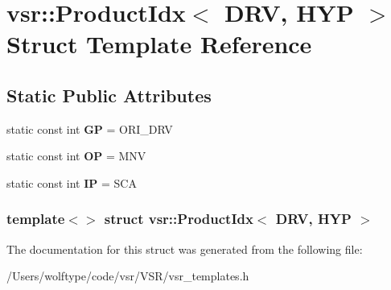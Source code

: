 \hypertarget{structvsr_1_1_product_idx_3_01_d_r_v_00_01_h_y_p_01_4}{\section{vsr\-:\-:Product\-Idx$<$ D\-R\-V, H\-Y\-P $>$ Struct Template Reference}
\label{structvsr_1_1_product_idx_3_01_d_r_v_00_01_h_y_p_01_4}
}
\subsection*{Static Public Attributes}
\begin{DoxyCompactItemize}
\item 
\hypertarget{structvsr_1_1_product_idx_3_01_d_r_v_00_01_h_y_p_01_4_a233726f20094809839500490e3f18b76}{static const int {\bfseries G\-P} = O\-R\-I\-\_\-\-D\-R\-V}\label{structvsr_1_1_product_idx_3_01_d_r_v_00_01_h_y_p_01_4_a233726f20094809839500490e3f18b76}

\item 
\hypertarget{structvsr_1_1_product_idx_3_01_d_r_v_00_01_h_y_p_01_4_a51993dbacb5b31d156bba56c8cbac2cd}{static const int {\bfseries O\-P} = M\-N\-V}\label{structvsr_1_1_product_idx_3_01_d_r_v_00_01_h_y_p_01_4_a51993dbacb5b31d156bba56c8cbac2cd}

\item 
\hypertarget{structvsr_1_1_product_idx_3_01_d_r_v_00_01_h_y_p_01_4_ad60689299effd4952e7f0974969453d0}{static const int {\bfseries I\-P} = S\-C\-A}\label{structvsr_1_1_product_idx_3_01_d_r_v_00_01_h_y_p_01_4_ad60689299effd4952e7f0974969453d0}

\end{DoxyCompactItemize}
\subsubsection*{template$<$$>$ struct vsr\-::\-Product\-Idx$<$ D\-R\-V, H\-Y\-P $>$}



The documentation for this struct was generated from the following file\-:\begin{DoxyCompactItemize}
\item 
/\-Users/wolftype/code/vsr/\-V\-S\-R/vsr\-\_\-templates.\-h\end{DoxyCompactItemize}
